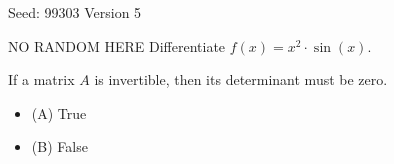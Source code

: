 \documentclass[12pt]{exam}
\begin{document}
{\small Seed: 99303 \hfill Version 5}

\vspace{1em}

\begin{questions}


\question NO RANDOM HERE Differentiate $f(x) = x^2 \cdot \sin(x)$.




  \vspace{2\baselineskip}  %






\vspace{1em}

\question If a matrix $A$ is invertible, then its determinant must be zero.




  \begin{itemize}[label={}]
    \item (A) True
    \item (B) False
  \end{itemize}







\vspace{1em}


\end{questions}
\end{document}
